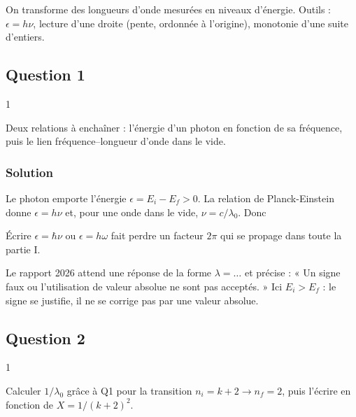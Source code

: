 \documentclass[11pt,a4paper]{article}
\newcommand{\equationajustee}[1]{%
  \sbox{\boiteequation}{$\displaystyle #1$}%
  \ifdim\wd\boiteequation>\linewidth
    \[\resizebox{\linewidth}{!}{\usebox{\boiteequation}}\]%
  \else
    \[#1\]%
  \fi}
\begin{document}
On transforme des longueurs d'onde mesurées en niveaux d'énergie. Outils : \(\epsilon=h\nu\), lecture d'une droite (pente, ordonnée à l'origine), monotonie d'une suite d'entiers.

\hypertarget{question-1}{%
\subsection{Question 1}\label{question-1}}

\begin{indication}{1}

Deux relations à enchaîner : l'énergie d'un photon en fonction de sa fréquence, puis le lien fréquence--longueur d'onde dans le vide.

\end{indication}

\hypertarget{solution}{%
\subsubsection{Solution}\label{solution}}

Le photon emporte l'énergie \(\epsilon=E_i-E_f>0\). La relation de Planck-Einstein donne \(\epsilon=h\nu\) et, pour une onde dans le vide, \(\nu=c/\lambda_0\). Donc

\equationajustee{\boxed{\lambda_0=\frac{hc}{E_i-E_f}}}

\begin{piege}

Écrire \(\epsilon=\hbar\nu\) ou \(\epsilon=h\omega\) fait perdre un facteur \(2\pi\) qui se propage dans toute la partie I.

\end{piege}

\begin{jury}

Le rapport 2026 attend une réponse de la forme \(\lambda=\dots\) et précise : « Un signe faux ou l'utilisation de valeur absolue ne sont pas acceptés. » Ici \(E_i>E_f\) : le signe se justifie, il ne se corrige pas par une valeur absolue.

\end{jury}

\hypertarget{question-2}{%
\subsection{Question 2}\label{question-2}}

\begin{indication}{1}

Calculer \(1/\lambda_0\) grâce à Q1 pour la transition \(n_i=k+2\to n_f=2\), puis l'écrire en fonction de \(X=1/(k+2)^2\).

\end{indication}
\end{document}
